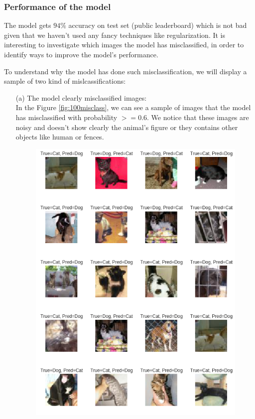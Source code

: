 \documentclass[a4paper]{article}
\begin{document}
\subsubsection{Performance of the model}
The model gets $94\%$ accuracy on test set (public leaderboard) which is not bad given that we haven't used any fancy techniques like regularization. It is interesting to investigate which images the model has misclassified, in order to identify ways to improve the model's performance. 

To understand why the model has done such misclassification, we will display a sample of two kind of mislcassifications:

\begin{itemize}
	\item[(a)] The model clearly misclassified images:\\
	In the Figure \ref{fig:100misclass}, we can see a sample of images that the model has misclassified with probability $>= 0.6$.
	We notice that these images are noisy and doesn't show clearly the animal's figure or they contains other objects like human or fences.
	\begin{figure}[h!]
		\centering
		\includegraphics[scale=.36]{100misclass.png}

\end{figure}
\end{itemize}
\end{document}
